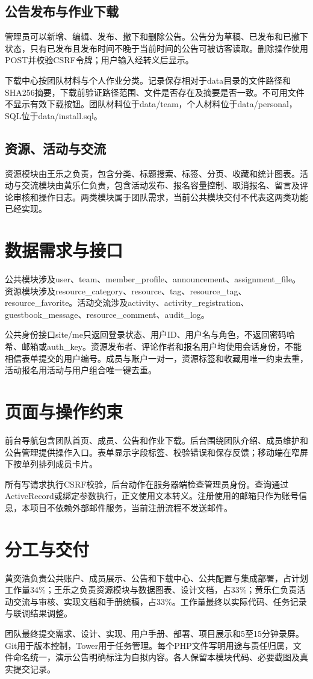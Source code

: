 \documentclass[UTF8,a4paper,11pt,fontset=windows]{ctexart}
\begin{document}
\subsection{公告发布与作业下载}
管理员可以新增、编辑、发布、撤下和删除公告。公告分为草稿、已发布和已撤下状态，只有已发布且发布时间不晚于当前时间的公告可被访客读取。删除操作使用POST并校验CSRF令牌；用户输入经转义后显示。

下载中心按团队材料与个人作业分类。记录保存相对于data目录的文件路径和SHA256摘要，下载前验证路径范围、文件是否存在及摘要是否一致。不可用文件不显示有效下载按钮。团队材料位于data/team，个人材料位于data/personal，SQL位于data/install.sql。

\subsection{资源、活动与交流}
资源模块由王乐之负责，包含分类、标题搜索、标签、分页、收藏和统计图表。活动与交流模块由黄乐仁负责，包含活动发布、报名容量控制、取消报名、留言及评论审核和操作日志。两类模块属于团队需求，当前公共模块交付不代表这两类功能已经实现。

\section{数据需求与接口}
公共模块涉及user、team、member\_profile、announcement、assignment\_file。资源模块涉及resource\_category、resource、tag、resource\_tag、resource\_favorite。活动交流涉及activity、activity\_registration、guestbook\_message、resource\_comment、audit\_log。

公共身份接口site/me只返回登录状态、用户ID、用户名与角色，不返回密码哈希、邮箱或auth\_key。资源发布者、评论作者和报名用户均使用会话身份，不能相信表单提交的用户编号。成员与账户一对一，资源标签和收藏用唯一约束去重，活动报名用活动与用户组合唯一键去重。

\section{页面与操作约束}
前台导航包含团队首页、成员、公告和作业下载。后台围绕团队介绍、成员维护和公告管理提供操作入口。表单显示字段标签、校验错误和保存反馈；移动端在窄屏下按单列排列成员卡片。

所有写请求执行CSRF校验，后台动作在服务器端检查管理员身份。查询通过ActiveRecord或绑定参数执行，正文使用文本转义。注册使用的邮箱只作为账号信息，本项目不依赖外部邮件服务，当前注册流程不发送邮件。

\section{分工与交付}
黄奕浩负责公共账户、成员展示、公告和下载中心、公共配置与集成部署，占计划工作量34\%；王乐之负责资源模块与数据图表、设计文档，占33\%；黄乐仁负责活动交流与审核、实现文档和手册统稿，占33\%。工作量最终以实际代码、任务记录与联调结果调整。

团队最终提交需求、设计、实现、用户手册、部署、项目展示和5至15分钟录屏。Git用于版本控制，Tower用于任务管理。每个PHP文件写明用途与责任归属，文件命名统一，演示公告明确标注为自拟内容。各人保留本模块代码、必要截图及真实提交记录。
\end{document}
